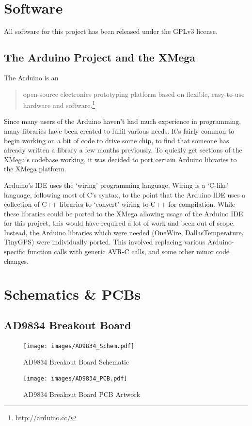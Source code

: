 \documentclass[a4paper,12pt]{article}
\begin{document}
\begin{appendices}
\section{Software}
All software for this project has been released under the GPLv3 license. 

\subsection{The Arduino Project and the XMega}
The Arduino is an
\begin{quote}
open-source electronics prototyping platform based on flexible, easy-to-use hardware and software.\footnote{http://arduino.cc/}
\end{quote}
Since many users of the Arduino haven't had much experience in programming, many libraries have been created to fulfil various needs. It's fairly common to begin working on a bit of code to drive some chip, to find that someone has already written a library a few months previously. To quickly get sections of the XMega's codebase working, it was decided to port certain Arduino libraries to the XMega platform. 

Arduino's IDE uses the `wiring' programming language. Wiring is a `C-like' language, following most of C's syntax, to the point that the Arduino IDE uses a collection of C++ libraries to `convert' wiring to C++ for compilation. While these libraries could be ported to the XMega allowing usage of the Arduino IDE for this project, this would have required a lot of work and been out of scope. Instead, the Arduino libraries which were needed (OneWire, DallasTemperature, TinyGPS) were individually ported. This involved replacing various Arduino-specific function calls with generic AVR-C calls, and some other minor code changes. 


\section{Schematics \& PCBs}
\subsection{AD9834 Breakout Board}
\label{ad9834_breakout}
\begin{figure}[h!]
\begin{center}
\texttt{[image: images/AD9834\_Schem.pdf]}
\caption{AD9834 Breakout Board Schematic}
\label{ad9834_schem}
\end{center}
\end{figure}
\begin{figure}[h!]
\begin{center}
\texttt{[image: images/AD9834\_PCB.pdf]}
\caption{AD9834 Breakout Board PCB Artwork}
\label{ad9834_PCB}
\end{center}
\end{figure}

\end{appendices}
\end{document}
